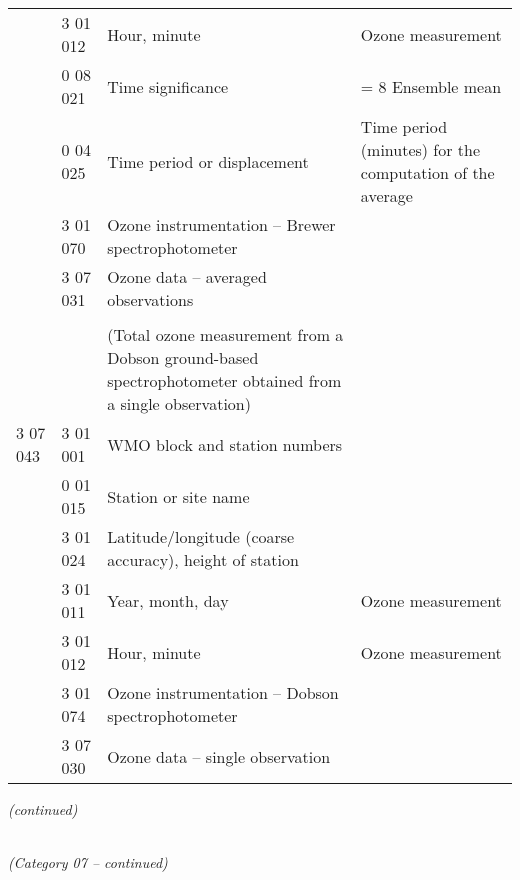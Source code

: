 \begin{longtable}[]{@{}llll@{}}
& 3 01 012 & Hour, minute & Ozone measurement\tabularnewline
& 0 08 021 & Time significance & = 8 Ensemble mean\tabularnewline
& 0 04 025 & Time period or displacement & Time period (minutes) for the computation of the average\tabularnewline
& 3 01 070 & Ozone instrumentation -- Brewer spectrophotometer &\tabularnewline
& 3 07 031 & Ozone data -- averaged observations &\tabularnewline
& & &\tabularnewline
& & (Total ozone measurement from a Dobson ground-based spectrophotometer obtained from a single observation) &\tabularnewline
3 07 043 & 3 01 001 & WMO block and station numbers &\tabularnewline
& 0 01 015 & Station or site name &\tabularnewline
& 3 01 024 & Latitude/longitude (coarse accuracy), height of station &\tabularnewline
& 3 01 011 & Year, month, day & Ozone measurement\tabularnewline
& 3 01 012 & Hour, minute & Ozone measurement\tabularnewline
& 3 01 074 & Ozone instrumentation -- Dobson spectrophotometer &\tabularnewline
& 3 07 030 & Ozone data -- single observation &\tabularnewline
\bottomrule
\end{longtable}

\emph{(continued)}

\emph{\\
(Category 07 -- continued)}


